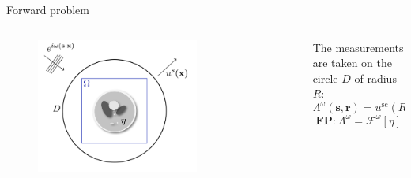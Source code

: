 \documentclass{beamer}
\begin{document}
\begin{frame}{Forward problem}
    \begin{columns}[T] %
        \begin{column}{.48\textwidth}
            \begin{figure}
                \centering
                \includegraphics[width=0.70\textwidth]{images/Wave propagation.png}
                \label{fig:enter-label}
            \end{figure}
        \end{column}%
        \hfill%
        \begin{column}{.48\textwidth}
            The measurements are taken on the circle $D$ of radius $R$:
            $$\Lambda^\omega (\mathbf{s}, \mathbf{r}) = u^{\text{sc}}(R \mathbf{r}; \mathbf{s})$$
            $$\textbf{FP:} \ \Lambda^\omega = \mathcal{F}^\omega [\eta]$$
        \end{column}%
        \end{columns}
\end{frame}
\end{document}
